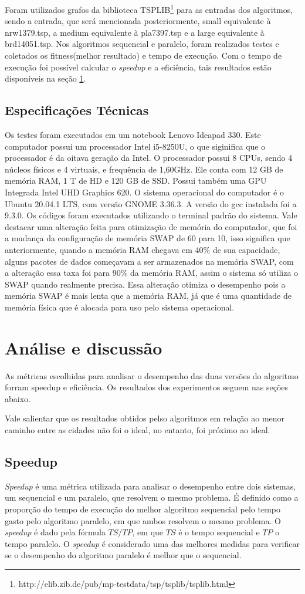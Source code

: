 \documentclass[journal]{IEEEtran}
\begin{document}
Foram utilizados grafos da biblioteca TSPLIB\footnote{http://elib.zib.de/pub/mp-testdata/tsp/tsplib/tsplib.html}  para as entradas dos algoritmos, sendo a entrada, que será mencionada posteriormente, small equivalente à nrw1379.tsp, a medium equivalente à pla7397.tsp e a large equivalente à brd14051.tsp. Nos algoritmos sequencial e paralelo, foram realizados testes e coletados os fitness(melhor resultado) e tempo de execução. Com o tempo de execução foi possível calcular o \textit{speedup} e a eficiência, tais resultados estão disponíveis na seção \ref{analise}. 

\subsection{Especificações Técnicas}
Os testes foram executados em um notebook Lenovo Ideapad 330. Este computador possui um processador Intel i5-8250U, o que siginifica que o processador é da oitava geração da Intel. O processador possui 8 CPUs, sendo 4 núcleos físicos e 4 virtuais, e frequência de 1,60GHz. Ele conta com 12 GB de memória RAM, 1 T de HD e 120 GB de SSD. Possui também uma GPU Integrada Intel UHD Graphics 620. 
O sistema operacional do computador é o Ubuntu 20.04.1 LTS, com versão GNOME 3.36.3. A versão do gcc instalada foi a 9.3.0. Os códigos foram executados utilizando o terminal padrão do sistema. Vale destacar uma alteração feita para otimização de memória do computador, que foi a mudança da configuração de memória SWAP de 60 para 10, isso significa que anteriormente, quando a memória RAM chegava em 40\% de sua capacidade, alguns pacotes de dados começavam a ser armazenados na memória SWAP, com a alteração essa taxa foi para 90\% da memória RAM, assim o sistema só utiliza o SWAP quando realmente precisa. Essa alteração otimiza o desempenho pois a memória SWAP é mais lenta que a memória RAM, já que é uma quantidade de memória física que é alocada para uso pelo sistema operacional.


\section{Análise e discussão}\label{analise}
As métricas escolhidas para analisar o desempenho das duas versões do algoritmo forram speedup e eficiência. Os resultados dos experimentos seguem nas seções abaixo.

Vale salientar que os resultados obtidos pelso algoritmos em relação ao menor caminho entre as cidades não foi o ideal, no entanto, foi próximo ao ideal.
\subsection{Speedup}\label{speedup}
\textit{Speedup} é uma métrica utilizada para analisar o desempenho entre dois sistemas, um sequencial e um paralelo, que resolvem o mesmo problema. É definido como a proporção do tempo de execução do melhor algoritmo sequencial pelo tempo gasto pelo algoritmo paralelo, em que ambos resolvem o mesmo problema. O \textit{speedup} é dado pela fórmula $TS/TP$, em que $TS$ é o tempo sequencial e $TP$ o tempo paralelo. O \textit{speedup} é considerado uma das melhores medidas para verificar se o desempenho do algoritmo paralelo é melhor que o sequencial.
\end{document}

